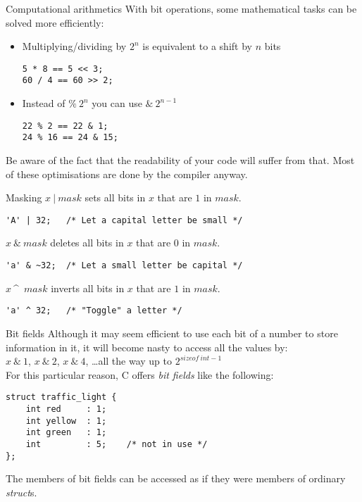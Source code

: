 \begin{frame}[fragile]{Computational arithmetics}
	With bit operations, some mathematical tasks can be solved more efficiently:
	\begin{itemize}
		\item Multiplying/dividing by $2^n$ is equivalent to a shift by $n$ bits
		\begin{lstlisting}
5 * 8 == 5 << 3;
60 / 4 == 60 >> 2;
\end{lstlisting}
		\item Instead of $\%\ 2^n$ you can use $\&\ 2^{n-1}$ 
		\begin{lstlisting}
22 % 2 == 22 & 1;
24 % 16 == 24 & 15;
\end{lstlisting}
	\end{itemize}\bigskip
	Be aware of the fact that the readability of your code will suffer from that. Most of these optimisations are done by the compiler anyway.
\end{frame}
\begin{frame}[fragile]{Masking}
	$x\ |\ mask$ sets all bits in $x$ that are $1$ in $mask$.\\
	\begin{lstlisting}
'A' | 32;	/* Let a capital letter be small */
\end{lstlisting}\bigskip
	$x\ \&\ mask$ deletes all bits in $x$ that are $0$ in $mask$.\\
	\begin{lstlisting}
'a' & ~32;	/* Let a small letter be capital */
\end{lstlisting}\bigskip
	$x\ $\textasciicircum\ $mask$ inverts all bits in $x$ that are $1$ in $mask$.\\
	\begin{lstlisting}
'a' ^ 32;	/* "Toggle" a letter */
\end{lstlisting}
\end{frame}

\begin{frame}[fragile]{Bit fields}
	Although it may seem efficient to use each bit of a number to store information in it, it will become nasty to access all the values by:\\
	$x\ \&\ 1$, $x\ \&\ 2$, $x\ \&\ 4$, \dots all the way up to $2^{sizeof\ int - 1}$\\
	\bigskip
	For this particular reason, C offers \textit{bit fields} like the following:
	\begin{lstlisting}
struct traffic_light {
	int red		: 1;
	int yellow	: 1;
	int green	: 1;
	int			: 5;	/* not in use */
};
\end{lstlisting}
	The members of bit fields can be accessed as if they were members of ordinary \textit{struct}s.

\end{frame}


